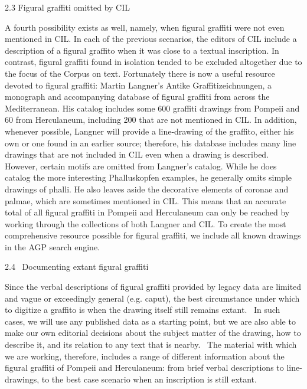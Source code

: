 \documentclass[amsthm,ebook]{saparticle}
\begin{document}
\bigskip

2.3 Figural graffiti omitted by CIL

A fourth possibility exists as well, namely, when figural graffiti were not even mentioned in CIL. In each of the
previous scenarios, the editors of CIL include a description of a figural graffito when it was close to a textual
inscription. In contrast, figural graffiti found in isolation tended to be excluded altogether due to the focus of the
Corpus on text. Fortunately there is now a useful resource devoted to figural graffiti: Martin Langner’s Antike
Graffitizeichnungen, a monograph and accompanying database of figural graffiti from across the Mediterranean. His
catalog includes some 600 graffiti drawings from Pompeii and 60 from Herculaneum, including 200 that are not mentioned
in CIL. In addition, whenever possible, Langner will provide a line-drawing of the graffito, either his own or one
found in an earlier source; therefore, his database includes many line drawings that are not included in CIL even when
a drawing is described. However, certain motifs are omitted from Langner’s catalog. While he does catalog the more
interesting Phalluskopfen examples, he generally omits simple drawings of phalli. He also leaves aside the decorative
elements of coronae and palmae, which are sometimes mentioned in CIL. This means that an accurate total of all figural
graffiti in Pompeii and Herculaneum can only be reached by working through the collections of both Langner and CIL. To
create the most comprehensive resource possible for figural graffiti, we include all known drawings in the AGP search
engine. \ 


\bigskip

2.4 \ Documenting extant figural graffiti

Since the verbal descriptions of figural graffiti provided by legacy data are limited and vague or exceedingly general
(e.g. caput), the best circumstance under which to digitize a graffito is when the drawing itself still remains extant.
\ In such cases, we will use any published data as a starting point, but we are also able to make our own editorial
decisions about the subject matter of the drawing, how to describe it, and its relation to any text that is nearby.
\ The material with which we are working, therefore, includes a range of different information about the figural
graffiti of Pompeii and Herculaneum: from brief verbal descriptions to line-drawings, to the best case scenario when an
inscription is still extant. 
\end{document}
